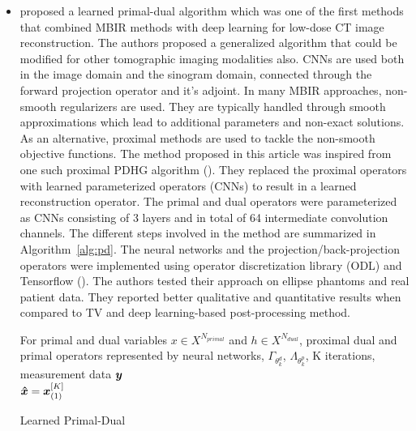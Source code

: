 \begin{itemize}
\item \cite{adler2018learned} proposed a learned primal-dual algorithm which was one of the first methods that combined \ac{MBIR} methods with deep learning for low-dose \ac{CT} image reconstruction. The authors proposed a generalized algorithm that could be modified for other tomographic imaging modalities also. \acp{CNN} are used both in the image domain and the sinogram domain, connected through the forward projection operator and it's adjoint. In many \ac{MBIR} approaches, non-smooth regularizers are used. They are typically handled through smooth approximations which lead to additional parameters and non-exact solutions. As an alternative, proximal methods are used to tackle the non-smooth objective functions. The method proposed in this article was inspired from one such proximal \ac{PDHG} algorithm (\cite{chambolle2011first}). They replaced the proximal operators with learned parameterized operators (\acp{CNN}) to result in a learned reconstruction operator. The primal and dual operators were parameterized as \acp{CNN} consisting of 3 layers and in total of 64 intermediate convolution channels. The different steps involved in the method are summarized in Algorithm~\ref{alg:pd}. The neural networks and the projection/back-projection operators were implemented using operator discretization library (ODL) and Tensorflow (\cite{abadi2016tensorflow}). The authors tested their approach on ellipse phantoms and real patient data. They reported better qualitative and quantitative results when compared to TV and deep learning-based post-processing method. 

\begin{algorithm}
\SetAlgoLined
For primal and dual variables $x \in X^{N_{primal}}$ and $h \in X^{N_{dual}}$, proximal dual and primal operators represented by neural networks,  $\Gamma_{\theta_{k}^{d}}$, $\Lambda_{\theta_{k}^{p}}$, K iterations, measurement data $\bm{y}$ \\
\Return $\bm{\hat{x}} = \bm{x}_{(1)}^{[K]}$
\caption{Learned Primal-Dual}
\label{alg:pd}
\end{algorithm}



\end{itemize}

